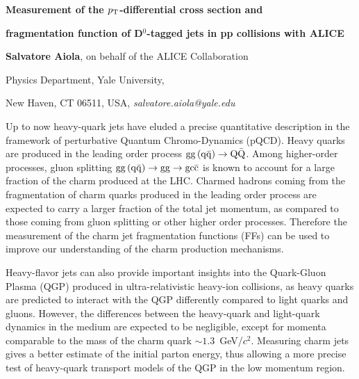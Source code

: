 \documentclass[12pt]{article}
\begin{document}
\centerline{\bf 
Measurement of the $p_{\rm T}$-differential cross section and
}

\centerline{\bf 
fragmentation function of D$^0$-tagged jets in pp collisions with ALICE
}

\vspace{12pt}

\centerline{ {\bf Salvatore Aiola}, on behalf of the ALICE Collaboration }

\vspace{12pt}

\centerline{Physics Department, Yale University,
}\centerline{New Haven, CT 06511, USA, {\it salvatore.aiola@yale.edu}}

\vspace{12pt}


\vspace{12pt} \vspace{12pt}

Up to now heavy-quark jets have eluded a precise quantitative description in the framework of perturbative Quantum Chromo-Dynamics (pQCD).
Heavy quarks are produced in the leading order process ${\rm gg\, (q\bar{q})} \rightarrow {\rm Q\bar{Q}}$.
Among higher-order processes, gluon splitting ${\rm gg\, (q\bar{q})} \rightarrow {\rm gg} \rightarrow \rm gc\bar{c}$
is known to account for a large fraction of the charm produced at the LHC.
Charmed hadrons coming from the fragmentation of charm quarks
produced in the leading order process
are expected to carry a larger fraction of the total jet momentum,
as compared to those coming from gluon splitting or other higher order processes. 
Therefore the measurement of the charm jet fragmentation functions (FFs) 
can be used to improve our understanding of the charm production mechanisms.

Heavy-flavor jets can also provide important insights into the Quark-Gluon Plasma (QGP)
produced in ultra-relativistic heavy-ion collisions, as heavy quarks are predicted
to interact with the QGP differently compared to light quarks and gluons. 
However, the differences between the heavy-quark and light-quark dynamics in the medium
are expected to be negligible, except for momenta comparable to the mass of the charm quark $\sim 1.3$~GeV/$c^2$.
Measuring charm jets gives a better estimate of the initial parton energy,
thus allowing a more precise test of heavy-quark transport models of the QGP in the low momentum region.
\end{document}
